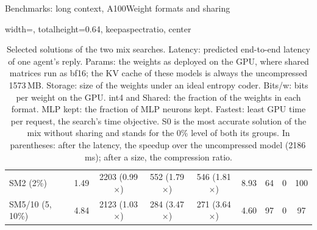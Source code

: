 \documentclass[aspectratio=169,10pt]{beamer}
\begin{document}
\begin{frame}{Benchmarks: long context, A100}{Weight formats and sharing}
\begin{table}
\begin{adjustbox}{width=\linewidth, totalheight=0.64\textheight, keepaspectratio, center}
\begin{tabular}{lcccccccc}
SM2 (2\%) & 1.49 & 2203 (0.99$\times$) & 552 (1.79$\times$) & 546 (1.81$\times$) & 8.93 & 64 & 0 & 100 \\
SM5/10 (5, 10\%) & 4.84 & 2123 (1.03$\times$) & 284 (3.47$\times$) & 271 (3.64$\times$) & 4.60 & 97 & 0 & 97 \\
\bottomrule
\end{tabular}
\end{adjustbox}
\caption{Selected solutions of the two mix searches. Latency: predicted end-to-end latency of one agent's reply. Params: the weights as deployed on the GPU, where shared matrices run as bf16; the KV cache of these models is always the uncompressed 1573\,MB. Storage: size of the weights under an ideal entropy coder. Bits/w: bits per weight on the GPU. int4 and Shared: the fraction of the weights in each format. MLP kept: the fraction of MLP neurons kept. Fastest: least GPU time per request, the search's time objective. S0 is the most accurate solution of the mix without sharing and stands for the 0\% level of both its groups. In parentheses: after the latency, the speedup over the uncompressed model (2186\,ms); after a size, the compression ratio.}\label{tab:turnmodels}
\end{table}
\end{frame}
\end{document}
